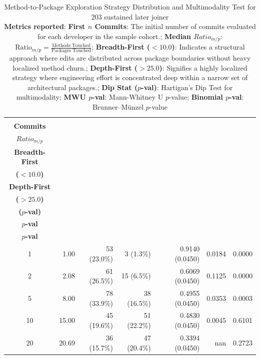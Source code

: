 \begin{table}[H]
\centering
\setlength{\tabcolsep}{2pt}
\caption[Ratio Strategy Table]{Method-to-Package Exploration Strategy Distribution and Multimodality Test for 203 sustained later joiner\\ \textbf{Metrics reported}:   \textbf{First $n$ Commits}: The initial number of commits evaluated for each developer in the sample cohort.;  \textbf{Median $Ratio_{m/p}$}: $\displaystyle \text{Ratio}_{m/p} = \frac{\text{Methods Touched}}{\text{Packages Touched}}$;  \textbf{Breadth-First ($<10.0$)}: Indicates a structural approach where edits are distributed across package boundaries without heavy localized method churn.;  \textbf{Depth-First ($>25.0$)}: Signifies a highly localized strategy where engineering effort is concentrated deep within a narrow set of architectural packages.;  \textbf{Dip Stat ($p$-val)}: Hartigan's Dip Test for multimodality;  \textbf{MWU $p$-val}: Mann-Whitney U $p$-value;  \textbf{Binomial $p$-val}: Brunner--Münzel $p$-value
}
\begin{tabular}{c r r r r r r}
\toprule
\makecell[t]{\textbf{First $n$}\\\textbf{Commits}} & \makecell[t]{\textbf{Median}\\\textbf{$Ratio_{m/p}$}} & \makecell[t]{\textbf{}\\\textbf{Breadth-First}\\\textbf{($<10.0$)}} & \makecell[t]{\textbf{}\\\textbf{Depth-First}\\\textbf{($>25.0$)}} & \makecell[t]{\textbf{Dip Stat}\\\textbf{($p$-val)}} & \makecell[t]{\textbf{MWU}\\\textbf{$p$-val}} & \makecell[t]{\textbf{Binomial}\\\textbf{$p$-val}} \\ 
\midrule
1 & 1.00 & 53 (23.0\%) & 3 (1.3\%) & 0.9140 (0.0450) & 0.0184 & 0.0000 \\ 
2 & 2.08 & 61 (26.5\%) & 15 (6.5\%) & 0.6069 (0.0450) & 0.1125 & 0.0000 \\ 
5 & 8.00 & 78 (33.9\%) & 38 (16.5\%) & 0.4955 (0.0450) & 0.0353 & 0.0003 \\ 
10 & 15.00 & 45 (19.6\%) & 51 (22.2\%) & 0.4830 (0.0450) & 0.0045 & 0.6101 \\ 
20 & 20.69 & 36 (15.7\%) & 47 (20.4\%) & 0.3394 (0.0450) & nan & 0.2723 \\ 
\bottomrule
\end{tabular}%
\label{tab:codebase_graph_latex_repository_graph_component_time_series_breadth_or_depth} 
\end{table}
\newpage 

